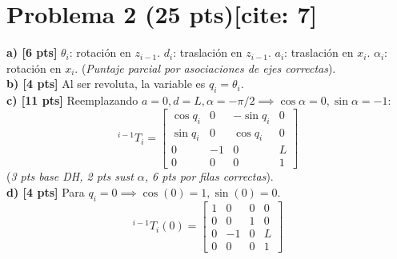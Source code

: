\documentclass[11pt, a4paper]{article}
\begin{document}
\section*{Problema 2 (25 pts)[cite: 7]}
\textbf{a) [6 pts]} $\theta_i$: rotación en $z_{i-1}$. $d_i$: traslación en $z_{i-1}$. $a_i$: traslación en $x_i$. $\alpha_i$: rotación en $x_i$. (\textit{Puntaje parcial por asociaciones de ejes correctas}).\\
\textbf{b) [4 pts]} Al ser revoluta, la variable es $q_i = \theta_i$.\\
\textbf{c) [11 pts]} Reemplazando $a=0, d=L, \alpha=-\pi/2 \implies \cos\alpha=0, \sin\alpha=-1$:
\begin{equation*}
    {}^{i-1}T_i = \begin{bmatrix} \cos q_i & 0 & -\sin q_i & 0 \\ \sin q_i & 0 & \cos q_i & 0 \\ 0 & -1 & 0 & L \\ 0 & 0 & 0 & 1 \end{bmatrix}
\end{equation*}
(\textit{3 pts base DH, 2 pts sust $\alpha$, 6 pts por filas correctas}).\\
\textbf{d) [4 pts]} Para $q_i=0 \implies \cos(0)=1, \sin(0)=0$.
\begin{equation*}
    {}^{i-1}T_i(0) = \begin{bmatrix} 1 & 0 & 0 & 0 \\ 0 & 0 & 1 & 0 \\ 0 & -1 & 0 & L \\ 0 & 0 & 0 & 1 \end{bmatrix}
\end{equation*}
\end{document}
